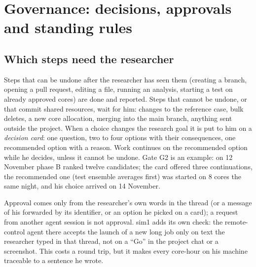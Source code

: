\documentclass[preprint,review,12pt]{elsarticle}
\begin{document}
\section{Governance: decisions, approvals and standing rules}\label{sec:governance}

\subsection{Which steps need the researcher}
Steps that can be undone after the researcher has seen them (creating a branch, opening a pull request, editing a file,
running an analysis, starting a test on already approved cores) are done and reported. Steps that cannot be undone, or
that commit shared resources, wait for him: changes to the reference case, bulk deletes, a new core allocation, merging
into the main branch, anything sent outside the project. When a choice changes the research goal it is put to him on a
\emph{decision card}: one question, two to four options with their consequences, one recommended option with a reason.
Work continues on the recommended option while he decides, unless it cannot be undone. Gate G2 is an example: on
12 November phase B ranked twelve candidates; the card offered three continuations, the recommended one (test ensemble
averages first) was started on 8 cores the same night, and his choice arrived on 14 November.

Approval comes only from the researcher's own words in the thread (or a message of his forwarded by its identifier, or
an option he picked on a card); a request from another agent session is not approval. sim1 adds its own check: the
remote-control agent there accepts the launch of a new long job only on text the researcher typed in that thread, not
on a ``Go'' in the project chat or a screenshot. This costs a round trip, but it makes every core-hour on his machine
traceable to a sentence he wrote.
\end{document}
